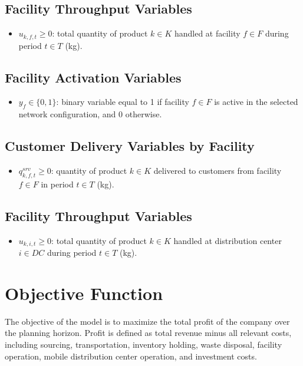 \documentclass[12pt]{article}
\begin{document}
\subsection{Facility Throughput Variables}
\begin{itemize}
    \item $u_{k,f,t} \geq 0$: total quantity of product $k \in K$ handled at facility $f \in F$ during period $t \in T$ (kg).
\end{itemize}

\subsection{Facility Activation Variables}
\begin{itemize}
    \item $y_f \in \{0,1\}$: binary variable equal to 1 if facility $f \in F$ is active in the selected network configuration, and 0 otherwise.
\end{itemize}

\subsection{Customer Delivery Variables by Facility}
\begin{itemize}
    \item $q^{srv}_{k,f,t} \geq 0$: quantity of product $k \in K$ delivered to customers from facility $f \in F$ in period $t \in T$ (kg).
\end{itemize}

\subsection{Facility Throughput Variables}
\begin{itemize}
    \item $u_{k,i,t} \geq 0$: total quantity of product $k \in K$ handled at distribution center $i \in DC$ during period $t \in T$ (kg).
\end{itemize}

\newpage

\section{Objective Function}

The objective of the model is to maximize the total profit of the company over the planning horizon. Profit is defined as total revenue minus all relevant costs, including sourcing, transportation, inventory holding, waste disposal, facility operation, mobile distribution center operation, and investment costs.
\end{document}
